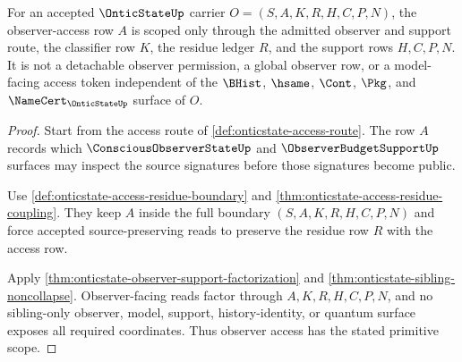 \begin{theorem}
\label{thm:onticstate-observer-access-scope}
For an accepted $\OnticStateUp$ carrier $O=(S,A,K,R,H,C,P,N)$, the observer-access row $A$ is scoped only through the admitted observer and support route, the classifier row $K$, the residue ledger $R$, and the support rows $H,C,P,N$. It is not a detachable observer permission, a global observer row, or a model-facing access token independent of the $\BHist$, $\hsame$, $\Cont$, $\Pkg$, and $\NameCert_{\OnticStateUp}$ surface of $O$.
\end{theorem}
\begin{proof}
Start from the access route of \autoref{def:onticstate-access-route}. The row $A$ records which $\ConsciousObserverStateUp$ and $\ObserverBudgetSupportUp$ surfaces may inspect the source signatures before those signatures become public.

Use \autoref{def:onticstate-access-residue-boundary} and \autoref{thm:onticstate-access-residue-coupling}. They keep $A$ inside the full boundary $(S,A,K,R,H,C,P,N)$ and force accepted source-preserving reads to preserve the residue row $R$ with the access row.

Apply \autoref{thm:onticstate-observer-support-factorization} and \autoref{thm:onticstate-sibling-noncollapse}. Observer-facing reads factor through $A,K,R,H,C,P,N$, and no sibling-only observer, model, support, history-identity, or quantum surface exposes all required coordinates. Thus observer access has the stated primitive scope.
\end{proof}

